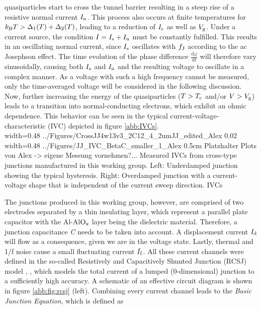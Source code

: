 quasiparticles start to cross the tunnel barrier resulting in a steep rise of a resistive normal current $I_{\rm n}$. This process also occurs at finite temperatures for $k_{\rm B}T>\Delta_1(T) + \Delta_2(T)$, leading to a reduction of $I_{\rm c}$ as well as $V_{\rm g}$. Under a current source, the condition $I=I_{\rm s}+I_{\rm n}$ must be constantly fulfilled. This results in an oscillating normal current, since $I_{\rm s}$ oscillates with $f_{\rm J}$ according to the ac Josephson effect. The time evolution  of the phase difference $\frac{\mathrm{d}\varphi}{\mathrm{d}t}$ will therefore vary sinusoidally, causing both $I_{\rm s}$ and $I_{\rm n}$ and the resulting voltage to oscillate in a complex manner. As a voltage with such a high frequency cannot be measured, only the time-averaged voltage will be considered in the following discussion. \\
Now, further increasing the energy of the quasiparticles ($T>T_{\rm c}$ and/or $V>V_{\rm g}$) leads to a transition into normal-conducting electrons, which exhibit an ohmic dependence. This behavior can be seen in the typical current-voltage-characteristic (IVC) depicted in figure \ref{abb:IVCs}. \\ 

{width=0.48\textwidth}
{../Figures/CrossJJ4w13v3_2C12_4_2umJJ_edited_Alex}
{0.02\textwidth} %
{width=0.48\textwidth}
{../Figures/JJ_IVC_BetaC_smaller_1_Alex}
{0.5cm} %
{Platzhalter Plots von Alex -> eigene Messung vornehmen?... Measured IVCs from cross-type junctions manufactured in this working group. Left: Underdamped junction showing the typical hysteresis. Right: Overdamped junction with a current-voltage shape that is independent of the current sweep direction. }
{IVCs}

The junctions produced in this working group, however, are comprised of two electrodes separated by a thin insulating layer, which represent a parallel plate capacitor with the Al-Al$\rm O_x$ layer being the dielectric material. Therefore, a junction capacitance \textit{C} needs to be taken into account. A displacement current $I_{\rm d}$ will flow as a consequence, given we are in the voltage state. Lastly, thermal and 1/f noise cause a small fluctuating current $I_{\rm f}$. All these current channels were defined in the so-called Resistively and Capacitively Shunted Junction (RCSJ) model \cite{Cumber1968}, \cite{Stewart1968}, which models the total current of a lumped (0-dimensional) junction to a sufficiently high accuracy. A schematic of an effective circuit diagram is shown in figure \ref{abb:fig:rcsj} (left). Combining every current channel leads to the \textit{Basic Junction Equation}, which is defined as \cite{Gross2016}

